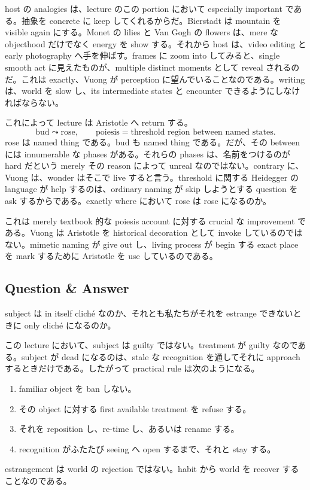 host の analogies は、lecture のこの portion において especially important である。抽象を concrete に keep してくれるからだ。Bierstadt は mountain を visible again にする。Monet の lilies と Van Gogh の flowers は、mere な objecthood だけでなく energy を show する。それから host は、video editing と early photography へ手を伸ばす。frames に zoom into してみると、single smooth act に見えたものが、multiple distinct moments として reveal されるのだ。これは exactly、Vuong が perception に望んでいることなのである。writing は、world を slow し、its intermediate states と encounter できるようにしなければならない。

これによって lecture は Aristotle へ return する。
\begin{equation}
\text{bud} \leadsto \text{rose}, \qquad \text{poiesis} = \text{threshold region between named states}.
\end{equation}
rose は named thing である。bud も named thing である。だが、その between には innumerable な phases がある。それらの phases は、名前をつけるのが hard だという merely その reason によって unreal なのではない。contrary に、Vuong は、wonder はそこで live すると言う。threshold に関する Heidegger の language が help するのは、ordinary naming が skip しようとする question を ask するからである。exactly where において rose は rose になるのか。

これは merely textbook 的な poiesis account に対する crucial な improvement である。Vuong は Aristotle を historical decoration として invoke しているのではない。mimetic naming が give out し、living process が begin する exact place を mark するために Aristotle を use しているのである。

\subsection{Question \& Answer}

subject は in itself cliché なのか、それとも私たちがそれを estrange できないときに only cliché になるのか。

この lecture において、subject は guilty ではない。treatment が guilty なのである。subject が dead になるのは、stale な recognition を通してそれに approach するときだけである。したがって practical rule は次のようになる。
\begin{enumerate}
\item familiar object を ban しない。
\item その object に対する first available treatment を refuse する。
\item それを reposition し、re-time し、あるいは rename する。
\item recognition がふたたび seeing へ open するまで、それと stay する。
\end{enumerate}
estrangement は world の rejection ではない。habit から world を recover することなのである。

